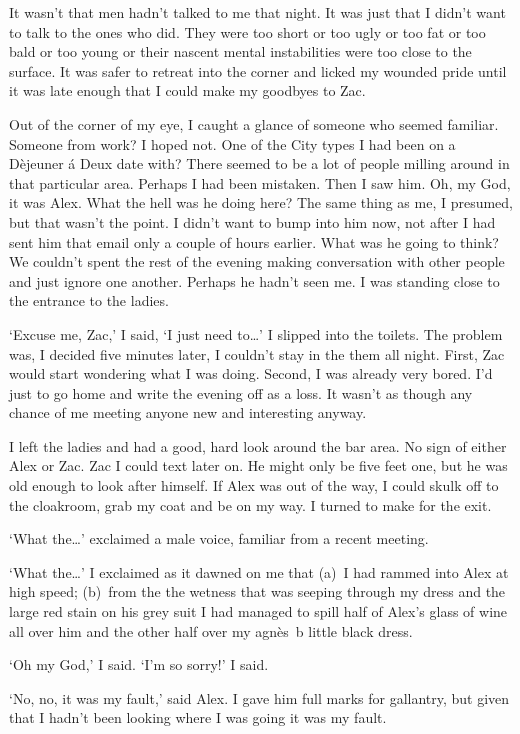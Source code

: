 It wasn't that men hadn't talked to me that night. It was just that
I didn't want to talk to the ones who did. They were too short or
too ugly or too fat or too bald or too young or their nascent mental
instabilities were too close to the surface. It was safer to retreat
into the corner and licked my wounded pride until it was late enough
that I could make my goodbyes to Zac.

Out of the corner of my eye, I caught a glance of someone who seemed
familiar. Someone from work? I hoped not. One of the City types I
had been on a Dèjeuner á Deux date with? There seemed to be a
lot of people milling around in that particular area. Perhaps I had
been mistaken. Then I saw him. Oh, my God, it was Alex. What the
hell was he doing here? The same thing as me, I presumed, but that
wasn't the point. I didn't want to bump into him now, not after I
had sent him that email only a couple of hours earlier. What was he
going to think? We couldn't spent the rest of the evening making
conversation with other people and just ignore one another. Perhaps
he hadn't seen me. I was standing close to the entrance to the
ladies.

`Excuse me, Zac,' I said, `I just need to\dots' I slipped into the
toilets. The problem was, I decided five minutes later, I couldn't
stay in the them all night. First, Zac would start wondering what
I was doing. Second, I was already very bored. I'd just to go home
and write the evening off as a loss. It wasn't as though any chance
of me meeting anyone new and interesting anyway.

I left the ladies and had a good, hard look around the bar area. No
sign of either Alex or Zac. Zac I could text later on. He might only
be five feet one, but he was old enough to look after himself. If
Alex was out of the way, I could skulk off to the cloakroom, grab my
coat and be on my way. I turned to make for the exit.

`What the\dots' exclaimed a male voice, familiar from a recent meeting.

`What the\dots' I exclaimed as it dawned on me that (a)~I had rammed
into Alex at high speed; (b)~from the the wetness that was seeping
through my dress and the large red stain on his grey suit I had
managed to spill half of Alex's glass of wine all over him and the
other half over my agnès~b little black dress.

`Oh my God,' I said. `I'm so sorry!' I said.

`No, no, it was my fault,' said Alex. I gave him full marks for
gallantry, but given that I hadn't been looking where I was going it
was my fault.

